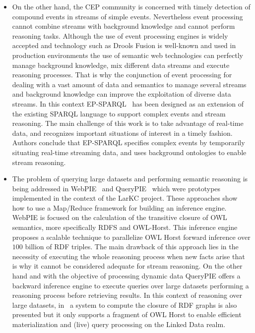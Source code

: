 \begin{itemize}
\item On the other hand, the CEP community is concerned with timely detection of 
compound events in streams of simple events. Nevertheless event processing 
cannot combine streams with background knowledge and cannot perform reasoning 
tasks. Although the use of event processing engines is widely accepted and 
technology such as Drools Fusion is well-known and used in production 
environments the use of semantic web technologies can perfectly manage 
background knowledge, mix different data streams and execute reasoning 
processes. That is why the conjunction of event processing for dealing with a 
vast amount of data and semantics to manage several streams and background 
knowledge can improve the exploitation of diverse data streams. In this context 
EP-SPARQL~\cite{Anicic:2011:EUL:1963405.1963495} has been designed as an extension of the existing SPARQL 
language to support complex events and stream reasoning. The main challenge of this work is to take 
advantage of real-time data, and recognizes important situations of interest in 
a timely fashion. Authors conclude that EP-SPARQL specifies complex events by 
temporarily situating real-time streaming data, and uses background ontologies 
to enable stream reasoning.

\item The problem of querying large datasets and performing semantic reasoning 
is being addressed in WebPIE~\cite{DBLP:journals/ws/UrbaniKMHB12} and QueryPIE~\cite{Urbani:2011:QBR:2063016.2063063} 
which were prototypes implemented in the context of the LarKC project. These approaches show how to use 
a Map/Reduce framework for building an inference engine. WebPIE is focused on 
the calculation of the transitive closure of OWL semantics, more specifically 
RDFS and OWL-Horst. This inference engine proposes a scalable technique to 
parallelize OWL Horst forward inference over $100$ billion of RDF triples. The 
main drawback of this approach lies in the necessity of executing the whole 
reasoning process when new facts arise that is why it cannot be considered 
adequate for stream reasoning. On the other hand and with the objective of 
processing dynamic data QueryPIE offers a backward inference engine to execute 
queries over large datasets performing a reasoning process before retrieving 
results. In this context of reasoning over large datasets, in~\cite{DBLP:journals/ijswis/HoganHP09,Umbrich:2012:IRL:2415113.2415129,Umbrich:2012:FUW:2413941.2413963} 
a system to compute the closure of RDF graphs is also presented but it 
only supports a fragment of OWL Horst to enable efficient materialization and (live) query processing on the Linked Data realm. 


\end{itemize}
